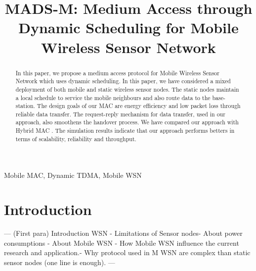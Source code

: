 \documentclass[a4paper, conference, 10pt]{IEEEtran}
\begin{document}
%
\title{MADS-M: Medium Access through Dynamic Scheduling for Mobile Wireless Sensor Network}



\author{
}

\maketitle

\begin{abstract}
	In this paper, we propose a medium access protocol for Mobile Wireless Sensor Network which uses dynamic scheduling. In this paper, we have considered a mixed deployment of both mobile and static wireless sensor nodes. The static nodes maintain a local schedule to service the mobile neighbours and also route data to the base-station. The design goals of our MAC are energy efficiency and low packet loss through reliable data transfer. The request-reply mechanism for data transfer, used in our approach, also smoothens the handover process. We have compared our approach with Hybrid MAC \cite{hmac}. The simulation results indicate that our approach performs betters in terms of scalability, reliability and throughput.%

\end{abstract}

\begin{keywords}
Mobile MAC, Dynamic TDMA, Mobile WSN
\end{keywords}

\IEEEpeerreviewmaketitle

\section{Introduction}
\label{intro}
--- (First para) Introduction  WSN - Limitations of Sensor nodes- About power consumptions - About Mobile WSN - How Mobile WSN influence the current research and application.- Why protocol used in M WSN are complex than static sensor nodes (one line is enough). ---\\ \\
\end{document}
